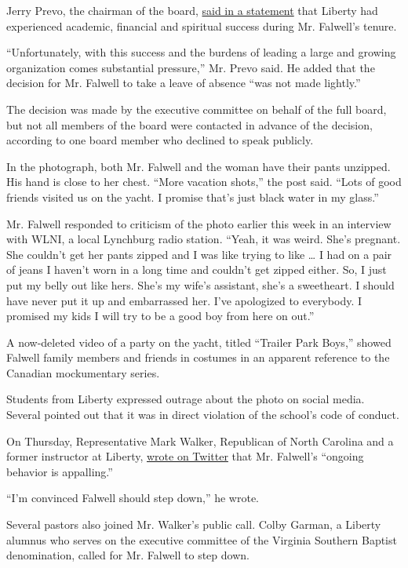 Jerry Prevo, the chairman of the board,
\href{http://www.liberty.edu/news/index.cfm?PID=18495\&MID=380387}{said
in a statement} that Liberty had experienced academic, financial and
spiritual success during Mr. Falwell's tenure.

``Unfortunately, with this success and the burdens of leading a large
and growing organization comes substantial pressure,'' Mr. Prevo said.
He added that the decision for Mr. Falwell to take a leave of absence
``was not made lightly.''

The decision was made by the executive committee on behalf of the full
board, but not all members of the board were contacted in advance of the
decision, according to one board member who declined to speak publicly.

In the photograph, both Mr. Falwell and the woman have their pants
unzipped. His hand is close to her chest. ``More vacation shots,'' the
post said. ``Lots of good friends visited us on the yacht. I promise
that's just black water in my glass.''

Mr. Falwell responded to criticism of the photo earlier this week in an
interview with WLNI, a local Lynchburg radio station. ``Yeah, it was
weird. She's pregnant. She couldn't get her pants zipped and I was like
trying to like \ldots{} I had on a pair of jeans I haven't worn in a
long time and couldn't get zipped either. So, I just put my belly out
like hers. She's my wife's assistant, she's a sweetheart. I should have
never put it up and embarrassed her. I've apologized to everybody. I
promised my kids I will try to be a good boy from here on out.''

A now-deleted video of a party on the yacht, titled ``Trailer Park
Boys,'' showed Falwell family members and friends in costumes in an
apparent reference to the Canadian mockumentary series.

Students from Liberty expressed outrage about the photo on social media.
Several pointed out that it was in direct violation of the school's code
of conduct.

On Thursday, Representative Mark Walker, Republican of North Carolina
and a former instructor at Liberty,
\href{https://twitter.com/RepMarkWalker/status/1291490728762368003}{wrote
on Twitter} that Mr. Falwell's ``ongoing behavior is appalling.''

``I'm convinced Falwell should step down,'' he wrote.

Several pastors also joined Mr. Walker's public call. Colby Garman, a
Liberty alumnus who serves on the executive committee of the Virginia
Southern Baptist denomination, called for Mr. Falwell to step down.

